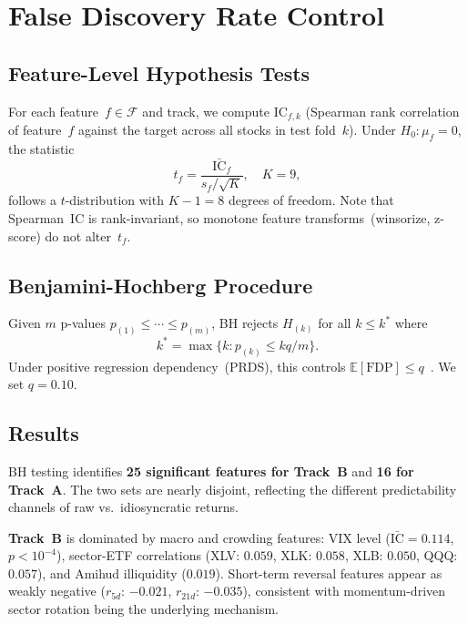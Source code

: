 \documentclass[journal]{IEEEtran}
\newcommand{\E}{\mathbb{E}}
\newcommand{\IC}{\mathrm{IC}}
\begin{document}
\section{False Discovery Rate Control}
\label{sec:fdr}

\subsection{Feature-Level Hypothesis Tests}
For each feature~$f \in \mathcal{F}$ and track, we compute
$\IC_{f,k}$ (Spearman rank correlation of feature~$f$ against the
target across all stocks in test fold~$k$).
Under $H_0: \mu_f = 0$, the statistic
\begin{equation}
  t_f = \frac{\bar{\IC}_f}{s_f / \sqrt{K}},\quad K=9,
  \label{eq:tstat}
\end{equation}
follows a $t$-distribution with $K-1=8$ degrees of freedom.
Note that Spearman~IC is rank-invariant, so monotone feature
transforms~(winsorize, z-score) do not alter~$t_f$.

\subsection{Benjamini-Hochberg Procedure}
Given $m$ p-values $p_{(1)} \leq \cdots \leq p_{(m)}$, BH rejects
$H_{(k)}$ for all $k \leq k^*$ where
\begin{equation}
  k^* = \max\bigl\{k : p_{(k)} \leq kq/m\bigr\}.
  \label{eq:bh}
\end{equation}
Under positive regression dependency~(PRDS), this controls
$\E[\text{FDP}] \leq q$~\cite{bh1995,bhy2001}.
We set $q = 0.10$.

\subsection{Results}
BH testing identifies \textbf{25 significant features for Track~B}
and \textbf{16 for Track~A}.
The two sets are nearly disjoint, reflecting the different
predictability channels of raw vs.\ idiosyncratic returns.

\noindent\textbf{Track~B} is dominated by macro and crowding
features: VIX level ($\bar{\IC} = 0.114$, $p < 10^{-4}$), sector-ETF
correlations (XLV: $0.059$, XLK: $0.058$, XLB: $0.050$, QQQ:
$0.057$), and Amihud illiquidity ($0.019$).
Short-term reversal features appear as weakly negative ($r_{5d}$:
$-0.021$, $r_{21d}$: $-0.035$), consistent with momentum-driven
sector rotation being the underlying mechanism.
\end{document}
